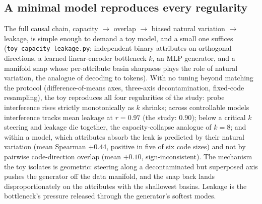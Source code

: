 \documentclass[11pt]{article}
\begin{document}
\subsection{A minimal model reproduces every regularity}
\label{sec:toy}
The full causal chain, capacity $\to$ overlap $\to$ biased natural variation
$\to$ leakage, is simple enough to demand a toy model, and a small one
suffices (\texttt{toy\_capacity\_leakage.py}; independent binary attributes on
orthogonal directions, a learned linear-encoder bottleneck $k$, an MLP
generator, and a manifold snap whose per-attribute basin sharpness plays the
role of natural variation, the analogue of decoding to tokens). With no
tuning beyond matching the protocol (difference-of-means axes, three-axis
decontamination, fixed-code resampling), the toy reproduces all four
regularities of the study: probe interference rises strictly monotonically as
$k$ shrinks; across controllable models interference tracks mean leakage at
$r{=}0.97$ (the study: $0.90$); below a critical $k$ steering and leakage die
together, the capacity-collapse analogue of $k{=}8$; and within a model,
which attributes absorb the leak is predicted by their natural variation
(mean Spearman $+0.44$, positive in five of six code sizes) and not by
pairwise code-direction overlap (mean $+0.10$, sign-inconsistent). The
mechanism the toy isolates is geometric: steering along a decontaminated but
superposed axis pushes the generator off the data manifold, and the snap back
lands disproportionately on the attributes with the shallowest basins. Leakage
is the bottleneck's pressure released through the generator's softest modes.
\end{document}
